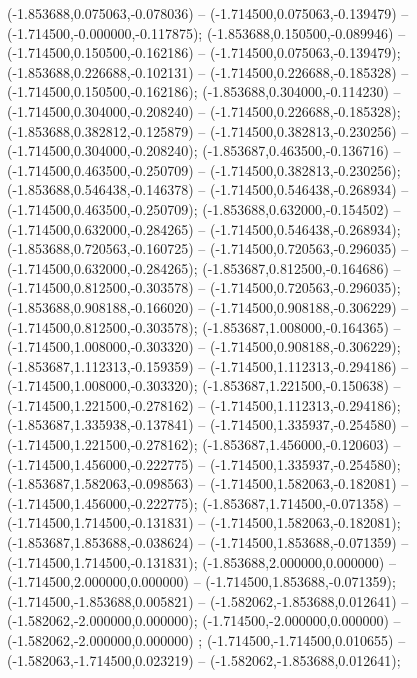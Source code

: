  (-1.853688,0.075063,-0.078036) -- (-1.714500,0.075063,-0.139479) -- (-1.714500,-0.000000,-0.117875);
 (-1.853688,0.150500,-0.089946) -- (-1.714500,0.150500,-0.162186) -- (-1.714500,0.075063,-0.139479);
 (-1.853688,0.226688,-0.102131) -- (-1.714500,0.226688,-0.185328) -- (-1.714500,0.150500,-0.162186);
 (-1.853688,0.304000,-0.114230) -- (-1.714500,0.304000,-0.208240) -- (-1.714500,0.226688,-0.185328);
 (-1.853688,0.382812,-0.125879) -- (-1.714500,0.382813,-0.230256) -- (-1.714500,0.304000,-0.208240);
 (-1.853687,0.463500,-0.136716) -- (-1.714500,0.463500,-0.250709) -- (-1.714500,0.382813,-0.230256);
 (-1.853688,0.546438,-0.146378) -- (-1.714500,0.546438,-0.268934) -- (-1.714500,0.463500,-0.250709);
 (-1.853688,0.632000,-0.154502) -- (-1.714500,0.632000,-0.284265) -- (-1.714500,0.546438,-0.268934);
 (-1.853688,0.720563,-0.160725) -- (-1.714500,0.720563,-0.296035) -- (-1.714500,0.632000,-0.284265);
 (-1.853687,0.812500,-0.164686) -- (-1.714500,0.812500,-0.303578) -- (-1.714500,0.720563,-0.296035);
 (-1.853688,0.908188,-0.166020) -- (-1.714500,0.908188,-0.306229) -- (-1.714500,0.812500,-0.303578);
 (-1.853687,1.008000,-0.164365) -- (-1.714500,1.008000,-0.303320) -- (-1.714500,0.908188,-0.306229);
 (-1.853687,1.112313,-0.159359) -- (-1.714500,1.112313,-0.294186) -- (-1.714500,1.008000,-0.303320);
 (-1.853687,1.221500,-0.150638) -- (-1.714500,1.221500,-0.278162) -- (-1.714500,1.112313,-0.294186);
 (-1.853687,1.335938,-0.137841) -- (-1.714500,1.335937,-0.254580) -- (-1.714500,1.221500,-0.278162);
 (-1.853687,1.456000,-0.120603) -- (-1.714500,1.456000,-0.222775) -- (-1.714500,1.335937,-0.254580);
 (-1.853687,1.582063,-0.098563) -- (-1.714500,1.582063,-0.182081) -- (-1.714500,1.456000,-0.222775);
 (-1.853687,1.714500,-0.071358) -- (-1.714500,1.714500,-0.131831) -- (-1.714500,1.582063,-0.182081);
 (-1.853687,1.853688,-0.038624) -- (-1.714500,1.853688,-0.071359) -- (-1.714500,1.714500,-0.131831);
 (-1.853688,2.000000,0.000000) -- (-1.714500,2.000000,0.000000) -- (-1.714500,1.853688,-0.071359);
 (-1.714500,-1.853688,0.005821) -- (-1.582062,-1.853688,0.012641) -- (-1.582062,-2.000000,0.000000);
 (-1.714500,-2.000000,0.000000) -- (-1.582062,-2.000000,0.000000) ;
 (-1.714500,-1.714500,0.010655) -- (-1.582063,-1.714500,0.023219) -- (-1.582062,-1.853688,0.012641);
